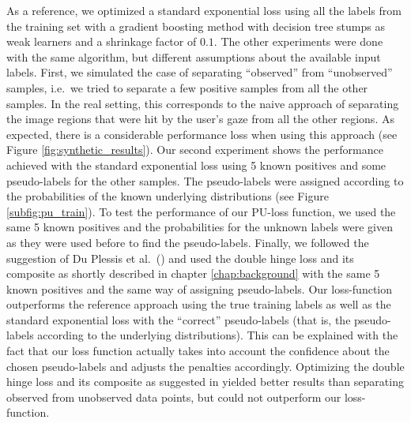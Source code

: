 As a reference, we optimized a standard exponential loss using all the labels from the training set with a gradient boosting method with decision tree stumps as weak learners and a shrinkage factor of $0.1.$ 
The other experiments were done with the same algorithm, but different assumptions about the available input labels. 
First, we simulated the case of separating ``observed'' from ``unobserved'' samples, i.e.\ we tried to separate a few positive samples from all the other samples. 
In the real setting, this corresponds to the naive approach of separating the image regions that were hit by the user's gaze from all the other regions. 
As expected, there is a considerable performance loss when using this approach (see Figure \ref{fig:synthetic_results}). 
Our second experiment shows the performance achieved with the standard exponential loss using 5 known positives and some pseudo-labels for the other samples. 
The pseudo-labels were assigned according to the probabilities of the known underlying distributions (see Figure \ref{subfig:pu_train}). 
To test the performance of our PU-loss function, we used the same 5 known positives and the probabilities for the unknown labels were given as they were used before to find the pseudo-labels. 
Finally, we followed the suggestion of Du Plessis et al.\ (\cite{plessis2015convex}) and used the double hinge loss and its composite as shortly described in chapter \ref{chap:background} with the same 5 known positives and the same way of assigning pseudo-labels.
Our loss-function outperforms the reference approach using the true training labels as well as the standard exponential loss with the ``correct'' pseudo-labels (that is, the pseudo-labels according to the underlying distributions). 
This can be explained with the fact that our loss function actually takes into account the confidence about the chosen pseudo-labels and adjusts the penalties accordingly. 
Optimizing the double hinge loss and its composite as suggested in \cite{plessis2015convex} yielded better results than separating observed from unobserved data points, but could not outperform our loss-function. 

